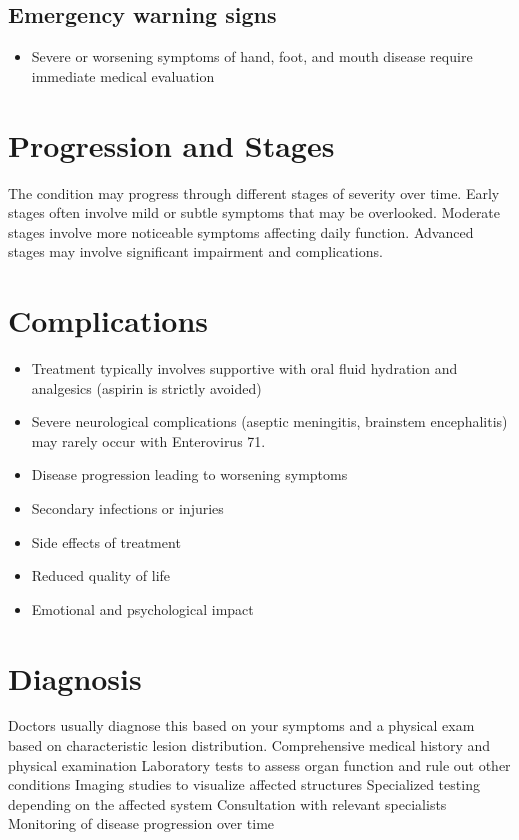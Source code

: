 \subsection{Emergency warning signs}
\begin{itemize}[noitemsep]
  \item Severe or worsening symptoms of hand, foot, and mouth disease require immediate medical evaluation
\end{itemize}
\section{Progression and Stages}
The condition may progress through different stages of severity over time. Early stages often involve mild or subtle symptoms that may be overlooked. Moderate stages involve more noticeable symptoms affecting daily function. Advanced stages may involve significant impairment and complications.
\section{Complications}
\begin{itemize}[noitemsep]
  \item Treatment typically involves supportive with oral fluid hydration and analgesics (aspirin is strictly avoided)
  \item Severe neurological complications (aseptic meningitis, brainstem encephalitis) may rarely occur with Enterovirus 71.
  \item Disease progression leading to worsening symptoms
  \item Secondary infections or injuries
  \item Side effects of treatment
  \item Reduced quality of life
  \item Emotional and psychological impact
\end{itemize}
\section{Diagnosis}
Doctors usually diagnose this based on your symptoms and a physical exam based on characteristic lesion distribution. Comprehensive medical history and physical examination Laboratory tests to assess organ function and rule out other conditions Imaging studies to visualize affected structures Specialized testing depending on the affected system Consultation with relevant specialists Monitoring of disease progression over time

